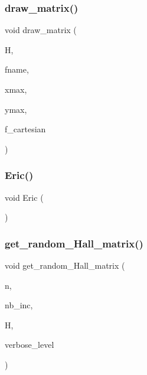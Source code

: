 \mbox{\label{test_8_c_a4c1e9c00227321ddd2da4d252011fd07}} 
\subsubsection{\texorpdfstring{draw\+\_\+matrix()}{draw\_matrix()}}
{\footnotesize\ttfamily void draw\+\_\+matrix (\begin{DoxyParamCaption}\item[{\mbox{\hyperlink{classmatrix}{matrix}} \&}]{H,  }\item[{\mbox{\hyperlink{galois_8h_ab6cc7b4aeb6ea31aba2b3fbfc83ff5e6}{B\+Y\+TE}} $\ast$}]{fname,  }\item[{\mbox{\hyperlink{galois_8h_a09fddde158a3a20bd2dcadb609de11dc}{I\+NT}}}]{xmax,  }\item[{\mbox{\hyperlink{galois_8h_a09fddde158a3a20bd2dcadb609de11dc}{I\+NT}}}]{ymax,  }\item[{\mbox{\hyperlink{galois_8h_a09fddde158a3a20bd2dcadb609de11dc}{I\+NT}}}]{f\+\_\+cartesian }\end{DoxyParamCaption})}

\mbox{\label{test_8_c_a6ef9140cdb0e33ceaf40e9e448ae37a4}} 
\subsubsection{\texorpdfstring{Eric()}{Eric()}}
{\footnotesize\ttfamily void Eric (\begin{DoxyParamCaption}{ }\end{DoxyParamCaption})}

\mbox{\label{test_8_c_a9068e33586261a19e71ea3cc6355e910}} 
\subsubsection{\texorpdfstring{get\+\_\+random\+\_\+\+Hall\+\_\+matrix()}{get\_random\_Hall\_matrix()}}
{\footnotesize\ttfamily void get\+\_\+random\+\_\+\+Hall\+\_\+matrix (\begin{DoxyParamCaption}\item[{\mbox{\hyperlink{galois_8h_a09fddde158a3a20bd2dcadb609de11dc}{I\+NT}}}]{n,  }\item[{\mbox{\hyperlink{galois_8h_a09fddde158a3a20bd2dcadb609de11dc}{I\+NT}}}]{nb\+\_\+inc,  }\item[{\mbox{\hyperlink{classmatrix}{matrix}} \&}]{H,  }\item[{\mbox{\hyperlink{galois_8h_a09fddde158a3a20bd2dcadb609de11dc}{I\+NT}}}]{verbose\+\_\+level }\end{DoxyParamCaption})}

